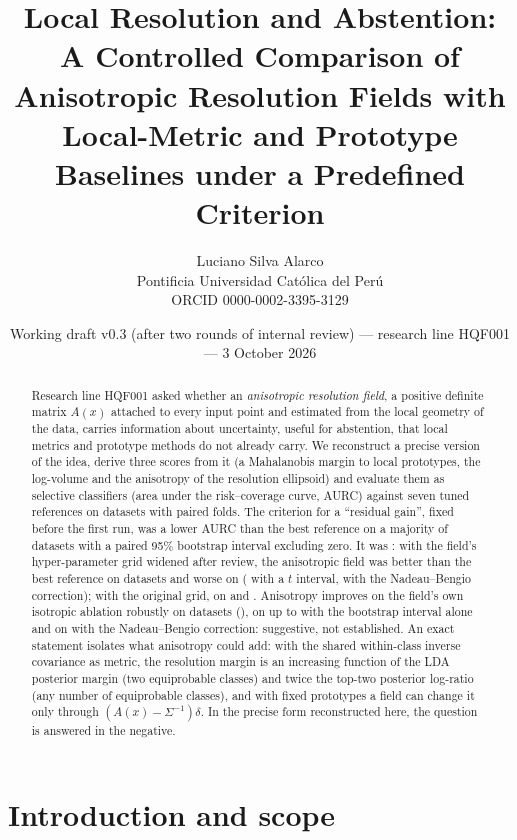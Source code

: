 \documentclass[10pt,a4paper]{article}
\title{\textbf{Local Resolution and Abstention:}\\[2pt]
\large A Controlled Comparison of Anisotropic Resolution Fields with Local-Metric and Prototype Baselines under a Predefined Criterion}
\author{Luciano Silva Alarco\\
\small Pontificia Universidad Cat\'olica del Per\'u\\
\small ORCID 0000-0002-3395-3129}
\date{\small Working draft v0.3 (after two rounds of internal review) --- research line HQF001 --- 3 October 2026}
\theoremstyle{plain}
\theoremstyle{definition}
\theoremstyle{remark}
\newcommand{\Sig}{\Sigma}
\begin{document}
\maketitle

\begin{abstract}
\noindent
Research line HQF001 asked whether an \emph{anisotropic resolution field}, a positive definite matrix $A(x)$ attached to every input point and estimated from the local geometry of the data, carries information about uncertainty, useful for abstention, that local metrics and prototype methods do not already carry. We reconstruct a precise version of the idea, derive three scores from it (a Mahalanobis margin to local prototypes, the log-volume and the anisotropy of the resolution ellipsoid) and evaluate them as selective classifiers (area under the risk--coverage curve, AURC) against seven tuned references on \MetaNDatasets{} datasets with \MetaFolds{} paired folds. The criterion for a ``residual gain'', fixed before the first run, was a lower AURC than the best reference on a majority of datasets with a paired 95\% bootstrap interval excluding zero. It was \CritFanisoMet: with the field's hyper-parameter grid widened after review, the anisotropic field was better than the best reference on \CritFanisoBetter{} datasets and worse on \CritFanisoWorse{} (\CritFanisoWorseT{} with a $t$ interval, \CritFanisoWorseNB{} with the Nadeau--Bengio correction); with the original grid, on \VTwoCritFanisoBetter{} and \VTwoCritFanisoWorse. Anisotropy improves on the field's own isotropic ablation robustly on \AblAnisoIsoFirstRobust{} datasets (\AblAnisoIsoFirstRobustList), on up to \AblAnisoIsoFirst{} with the bootstrap interval alone and on \AblAnisoIsoFirstNB{} with the Nadeau--Bengio correction: suggestive, not established. An exact statement isolates what anisotropy could add: with the shared within-class inverse covariance as metric, the resolution margin is an increasing function of the LDA posterior margin (two equiprobable classes) and twice the top-two posterior log-ratio (any number of equiprobable classes), and with fixed prototypes a field can change it only through $(A(x)-\Sig^{-1})\delta$. In the precise form reconstructed here, the question is answered in the negative.
\end{abstract}

\section{Introduction and scope}\label{sec:intro}
\end{document}
